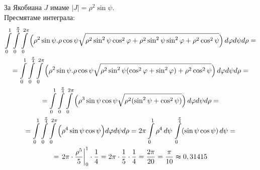 \documentclass[fleqn,12pt]{article}
\begin{document}
За Якобиана $J$ имаме $|J| = \rho^2 \sin \psi$.\\
Пресмятаме интеграла:
\begin{multline}
\int\limits_{0}^{1} \int\limits_{0}^{\frac{\pi}{4}} \int\limits_{0}^{2\pi} \Big(\rho^2 \sin \psi . \rho \cos \psi
\sqrt{\rho^2 \sin^2 \psi \cos^2 \varphi + \rho^2 \sin^2 \psi \sin^2 \varphi + \rho^2 \cos^2 \psi}\Big)\, d\varphi d\psi d\rho =\\
= \int\limits_{0}^{1} \int\limits_{0}^{\frac{\pi}{4}} \int\limits_{0}^{2\pi} \Big(\rho^2 \sin \psi . \rho \cos \psi
\sqrt{\rho^2 \sin^2 \psi (\cos^2 \varphi + \sin^2 \varphi) + \rho^2 \cos^2 \psi}\Big)\, d\varphi d\psi d\rho =\\
= \int\limits_{0}^{1} \int\limits_{0}^{\frac{\pi}{4}} \int\limits_{0}^{2\pi} \Big(\rho^3 \sin \psi \cos \psi
\sqrt{\rho^2 (\sin^2 \psi + \cos^2 \psi)}\Big)\, d\varphi d\psi d\rho =\\
= \int\limits_{0}^{1} \int\limits_{0}^{\frac{\pi}{4}} \int\limits_{0}^{2\pi} \Big(\rho^4 \sin \psi \cos \psi \Big) d\varphi d\psi d\rho =
 2\pi \int\limits_{0}^{1} \rho^4 \, d\psi \, \int\limits_{0}^{\frac{\pi}{4}}(\sin \psi \cos \psi)\, d\psi =\\
= \left. 2\pi \cdot \frac{\rho^5}{5} \right\vert_{0}^{1} \cdot \frac{1}{4} =
2\pi \cdot \frac{1}{5} \cdot \frac{1}{4} = \frac{2\pi}{20} = \frac{\pi}{10} \thickapprox 0,31415
\end{multline}
\end{document}
